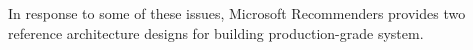 
%
In response to some of these issues, 
Microsoft Recommenders provides two reference architecture designs for building production-grade system. 

